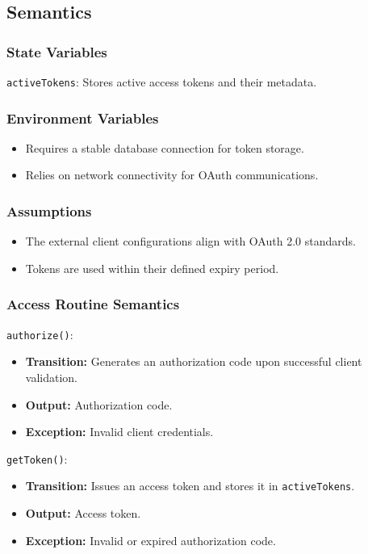 \documentclass[12pt, titlepage]{article}
\begin{document}
\subsection{Semantics}

\subsubsection{State Variables}

\texttt{activeTokens}: Stores active access tokens and their metadata.

\subsubsection{Environment Variables}

\begin{itemize}
    \item Requires a stable database connection for token storage.
    \item Relies on network connectivity for OAuth communications.
\end{itemize}

\subsubsection{Assumptions}

\begin{itemize}
    \item The external client configurations align with OAuth 2.0 standards.
    \item Tokens are used within their defined expiry period.
\end{itemize}

\subsubsection{Access Routine Semantics}

\noindent \texttt{authorize()}:
\begin{itemize}
    \item \textbf{Transition:} Generates an authorization code upon successful client validation.
    \item \textbf{Output:} Authorization code.
    \item \textbf{Exception:} Invalid client credentials.
\end{itemize}

\noindent \texttt{getToken()}:
\begin{itemize}
    \item \textbf{Transition:} Issues an access token and stores it in \texttt{activeTokens}.
    \item \textbf{Output:} Access token.
    \item \textbf{Exception:} Invalid or expired authorization code.
\end{itemize}
\end{document}
